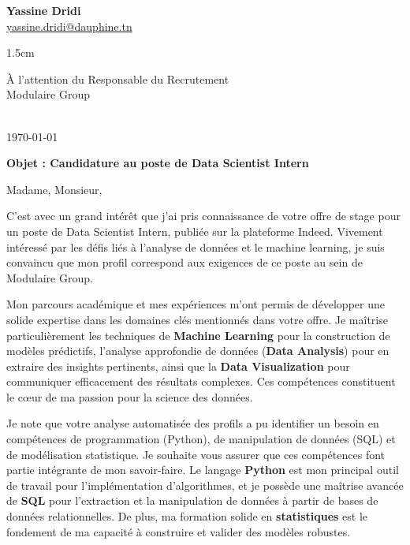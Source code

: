 \documentclass[11pt, a4paper]{article}
\newcommand{\contactinfo}[3]{%
    \begin{center}
        {\Huge \bfseries #1} \\
        \vspace{4mm}
        \href{mailto:#2}{#2}
    \end{center}
}
\begin{document}
\contactinfo{Yassine Dridi}{yassine.dridi@dauphine.tn}

\vspace{1.5cm}

\begin{flushleft}
    À l'attention du Responsable du Recrutement \\
    Modulaire Group \\
    [Adresse de Modulaire Group] \\
    [Code Postal, Ville]
\end{flushleft}

\hfill \today

\vspace{1.5cm}

\noindent
\textbf{Objet : Candidature au poste de Data Scientist Intern}

\vspace{1cm}

\noindent
Madame, Monsieur,

\vspace{5mm}

\noindent
C'est avec un grand intérêt que j'ai pris connaissance de votre offre de stage pour un poste de Data Scientist Intern, publiée sur la plateforme Indeed. Vivement intéressé par les défis liés à l'analyse de données et le machine learning, je suis convaincu que mon profil correspond aux exigences de ce poste au sein de Modulaire Group.

\vspace{4mm}

\noindent
Mon parcours académique et mes expériences m'ont permis de développer une solide expertise dans les domaines clés mentionnés dans votre offre. Je maîtrise particulièrement les techniques de \textbf{Machine Learning} pour la construction de modèles prédictifs, l'analyse approfondie de données (\textbf{Data Analysis}) pour en extraire des insights pertinents, ainsi que la \textbf{Data Visualization} pour communiquer efficacement des résultats complexes. Ces compétences constituent le cœur de ma passion pour la science des données.

\vspace{4mm}

\noindent
Je note que votre analyse automatisée des profils a pu identifier un besoin en compétences de programmation (Python), de manipulation de données (SQL) et de modélisation statistique. Je souhaite vous assurer que ces compétences font partie intégrante de mon savoir-faire. Le langage \textbf{Python} est mon principal outil de travail pour l'implémentation d'algorithmes, et je possède une maîtrise avancée de \textbf{SQL} pour l'extraction et la manipulation de données à partir de bases de données relationnelles. De plus, ma formation solide en \textbf{statistiques} est le fondement de ma capacité à construire et valider des modèles robustes.
\end{document}
